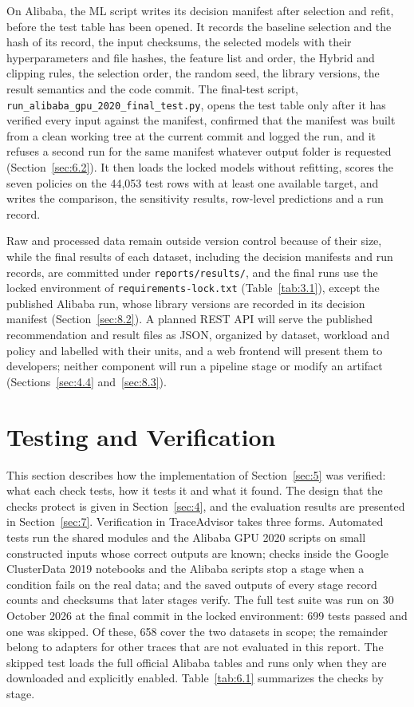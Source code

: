 \documentclass{IEEEtran}
\begin{document}
On Alibaba, the ML script writes its decision manifest after selection and refit, before the test table has been opened. It records the baseline selection and the hash of its record, the input checksums, the selected models with their hyperparameters and file hashes, the feature list and order, the Hybrid and clipping rules, the selection order, the random seed, the library versions, the result semantics and the code commit. The final-test script, \texttt{run\_alibaba\_gpu\_2020\_final\_test.py}, opens the test table only after it has verified every input against the manifest, confirmed that the manifest was built from a clean working tree at the current commit and logged the run, and it refuses a second run for the same manifest whatever output folder is requested (Section~\ref{sec:6.2}). It then loads the locked models without refitting, scores the seven policies on the 44,053 test rows with at least one available target, and writes the comparison, the sensitivity results, row-level predictions and a run record.

Raw and processed data remain outside version control because of their size, while the final results of each dataset, including the decision manifests and run records, are committed under \texttt{reports/results/}, and the final runs use the locked environment of \texttt{requirements-lock.txt} (Table~\ref{tab:3.1}), except the published Alibaba run, whose library versions are recorded in its decision manifest (Section~\ref{sec:8.2}). A planned REST API will serve the published recommendation and result files as JSON, organized by dataset, workload and policy and labelled with their units, and a web frontend will present them to developers; neither component will run a pipeline stage or modify an artifact (Sections~\ref{sec:4.4} and~\ref{sec:8.3}).

\section{Testing and Verification}\label{sec:6}

This section describes how the implementation of Section~\ref{sec:5} was verified: what each check tests, how it tests it and what it found. The design that the checks protect is given in Section~\ref{sec:4}, and the evaluation results are presented in Section~\ref{sec:7}. Verification in TraceAdvisor takes three forms. Automated tests run the shared modules and the Alibaba GPU 2020 scripts \cite{ref19} on small constructed inputs whose correct outputs are known; checks inside the Google ClusterData 2019 notebooks \cite{ref7} and the Alibaba scripts stop a stage when a condition fails on the real data; and the saved outputs of every stage record counts and checksums that later stages verify. The full test suite was run on 30 October 2026 at the final commit in the locked environment: 699 tests passed and one was skipped. Of these, 658 cover the two datasets in scope; the remainder belong to adapters for other traces that are not evaluated in this report. The skipped test loads the full official Alibaba tables and runs only when they are downloaded and explicitly enabled. Table~\ref{tab:6.1} summarizes the checks by stage.
\end{document}
